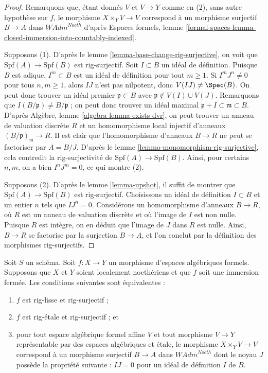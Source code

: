 \begin{proof}
Remarquons que, étant donnés $V$ et $V \to Y$ comme en (2), sans autre
hypothèse sur $f$, le morphisme $X \times_Y V \to V$
correspond à un morphisme surjectif $B \to A$ dans $\textit{WAdm}^{Noeth}$
d'après Espaces formels, lemme
\ref{formal-spaces-lemma-closed-immersion-into-countably-indexed}.

\medskip\noindent
Supposons (1). D'après le lemme \ref{lemma-base-change-rig-surjective}, on voit que
$\text{Spf}(A) \to \text{Spf}(B)$ est rig-surjectif.
Soit $I \subset B$ un idéal de définition. Puisque $B$ est adique,
$I^m \subset B$ est un idéal de définition pour tout $m \geq 1$.
Si $I^m J^n \not = 0$ pour tous $n, m \geq 1$, alors
$IJ$ n'est pas nilpotent, donc $V(IJ) \not = \Spec(B)$.
On peut donc trouver un idéal premier $\mathfrak p \subset B$
avec $\mathfrak p \not \in V(I) \cup V(J)$.
Remarquons que $I(B/\mathfrak p) \not = B/\mathfrak p$ ;
on peut donc trouver un idéal maximal
$\mathfrak p + I \subset \mathfrak m \subset B$.
D'après Algèbre, lemme \ref{algebra-lemma-exists-dvr},
on peut trouver un anneau de valuation discrète $R$
et un homomorphisme local injectif d'anneaux $(B/\mathfrak p)_\mathfrak m \to R$.
Il est clair que l'homomorphisme d'anneaux $B \to R$ ne peut se factoriser par $A = B/J$.
D'après le lemme \ref{lemma-monomorphism-rig-surjective},
cela contredit la rig-surjectivité de $\text{Spf}(A) \to \text{Spf}(B)$.
Ainsi, pour certains $n, m$, on a bien $I^n J^m = 0$,
ce qui montre (2).

\medskip\noindent
Supposons (2). D'après le lemme \ref{lemma-upshot}, il suffit de montrer
que $\text{Spf}(A) \to \text{Spf}(B)$ est rig-surjectif.
Choisissons un idéal de définition $I \subset B$ et un entier $n$
tels que $I J^n = 0$.
Considérons un homomorphisme d'anneaux $B \to R$, où $R$ est un anneau de
valuation discrète et où l'image de $I$ est non nulle. Puisque $R$ est intègre,
on en déduit que l'image de $J$ dans $R$ est nulle. Ainsi, $B \to R$
se factorise par la surjection $B \to A$, et l'on conclut par la
définition des morphismes rig-surjectifs.
\end{proof}

\begin{lemma}
\label{lemma-closed-immersion-rig-smooth-rig-surjective}
Soit $S$ un schéma. Soit $f : X \to Y$ un morphisme d'espaces algébriques
formels. Supposons que $X$ et $Y$ soient localement noethériens et que $f$ soit une
immersion fermée. Les conditions suivantes sont équivalentes :
\begin{enumerate}
\item $f$ est rig-lisse et rig-surjectif ;
\item $f$ est rig-étale et rig-surjectif ; et
\item pour tout espace algébrique formel affine $V$ et tout morphisme
$V \to Y$ représentable par des espaces algébriques et étale,
le morphisme $X \times_Y V \to V$ correspond à un morphisme surjectif
$B \to A$ dans $\textit{WAdm}^{Noeth}$ dont le noyau $J$ possède la propriété
suivante : $IJ = 0$ pour un idéal de définition $I$ de $B$.
\end{enumerate}
\end{lemma}

